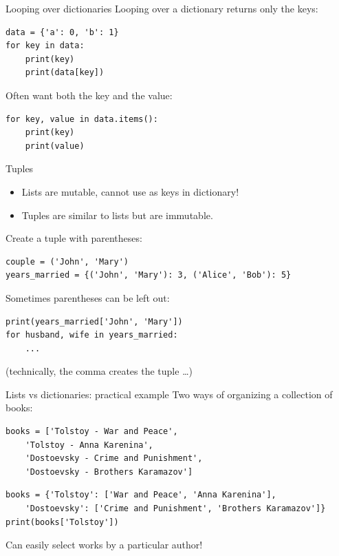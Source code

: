 \documentclass[aspectratio=169,usenames,dvipsnames]{beamer}
\begin{document}
\begin{frame}[fragile]{Looping over dictionaries}
Looping over a dictionary returns only the keys:
\begin{lstlisting}
data = {'a': 0, 'b': 1}
for key in data:
    print(key)
    print(data[key])
\end{lstlisting}

\pause
Often want both the key and the value:
\begin{lstlisting}
for key, value in data.items():
    print(key)
    print(value)
\end{lstlisting}
\end{frame}

\begin{frame}[fragile]{Tuples}
    \begin{itemize}
        \item Lists are mutable, cannot use as keys in dictionary!
        \item Tuples are similar to lists but are immutable.
    \end{itemize}
Create a tuple with parentheses:

\begin{lstlisting}
couple = ('John', 'Mary')
years_married = {('John', 'Mary'): 3, ('Alice', 'Bob'): 5}
\end{lstlisting}

\pause
Sometimes parentheses can be left out:
\begin{lstlisting}
print(years_married['John', 'Mary'])
for husband, wife in years_married:
    ...
\end{lstlisting}

(technically, the comma creates the tuple \dots)

\end{frame}

\begin{frame}[fragile]{Lists vs dictionaries: practical example}
Two ways of organizing a collection of books:
\begin{lstlisting}
books = ['Tolstoy - War and Peace',
    'Tolstoy - Anna Karenina',
    'Dostoevsky - Crime and Punishment',
    'Dostoevsky - Brothers Karamazov']
\end{lstlisting}

\pause
\begin{lstlisting}
books = {'Tolstoy': ['War and Peace', 'Anna Karenina'],
    'Dostoevsky': ['Crime and Punishment', 'Brothers Karamazov']}
print(books['Tolstoy'])
\end{lstlisting}
Can easily select works by a particular author!
\end{frame}
\end{document}

